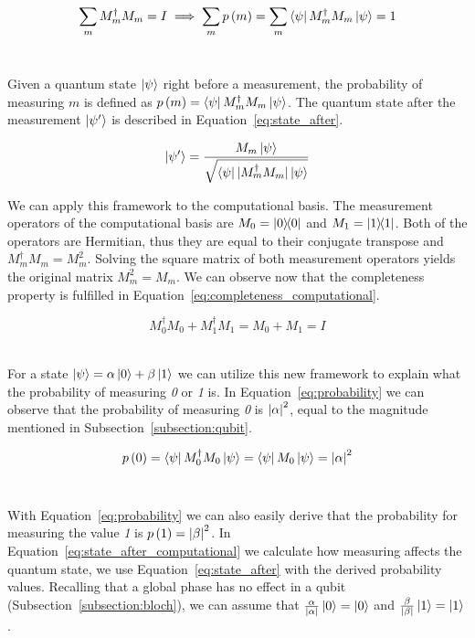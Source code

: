 \begin{equation}\label{eq:completeness}
    \sum_{m}M_m^{\dag}M_m = I 
    \implies \sum_{m}p\left(m\right) = \sum_{m}\bra{\psi}M_m^{\dag}M_m\ket{\psi} = 1
\end{equation} \

Given a quantum state \(\ket{\psi}\) right before a measurement, the
probability of measuring \(m\) is defined as
\(p\left(m\right) = \bra{\psi}M_m^{\dag}M_m\ket{\psi}\).
The quantum state after the measurement \(\ket{\psi'}\) is described in
Equation~\ref{eq:state_after}. \

\begin{equation}\label{eq:state_after}
  \ket{\psi'} = \frac{M_m\ket{\psi}}{\sqrt{\bra{\psi}|M_m^{\dag}M_m|\ket{\psi}}}
\end{equation}

We can apply this framework to the computational basis. The
measurement operators of the computational basis are
\(M_0 = \ketbra{0}{0}\) and \(M_1 = \ketbra{1}{1}\). Both
of the operators are Hermitian, thus they are equal to their
conjugate transpose and \(M_m^{\dag}M_m = M_m^2\). 
Solving the square matrix of both measurement operators 
yields the original matrix \(M_m^2 = M_m\). We can observe
now that the completeness property is fulfilled in
Equation~\ref{eq:completeness_computational}. \

\begin{equation}\label{eq:completeness_computational}
  M_0^{\dag}M_0 + M_1^{\dag}M_1 = M_0 + M_1 = I
\end{equation} \

For a state \(\ket{\psi} = \alpha\ket{0} + \beta\ket{1}\) we
can utilize this new framework to explain what the probability
of measuring \textit{0} or \textit{1} is. In Equation~\ref{eq:probability}
we can observe that the probability of measuring \textit{0} is
\(\abs{\alpha}^2\), equal to the magnitude mentioned
in Subsection~\ref{subsection:qubit}. \

\begin{equation}\label{eq:probability}
  p\left(0\right) = \bra{\psi}M_0^{\dag}M_0\ket{\psi} =
  \bra{\psi}M_0\ket{\psi} = \abs{\alpha}^2
\end{equation} \

With Equation~\ref{eq:probability} we can also easily derive that the probability for
measuring the value \textit{1} is \(p\left(1\right) = \abs{\beta}^2\).
In Equation~\ref{eq:state_after_computational} we calculate how measuring
affects the quantum state, we use Equation~\ref{eq:state_after} with the
derived probability values. Recalling that a global phase has no effect
in a qubit (Subsection~\ref{subsection:bloch}), we can assume that
\(\frac{\alpha}{\abs{\alpha}}\ket{0} = \ket{0}\) and
\(\frac{\beta}{\abs{\beta}}\ket{1} = \ket{1}\). \

